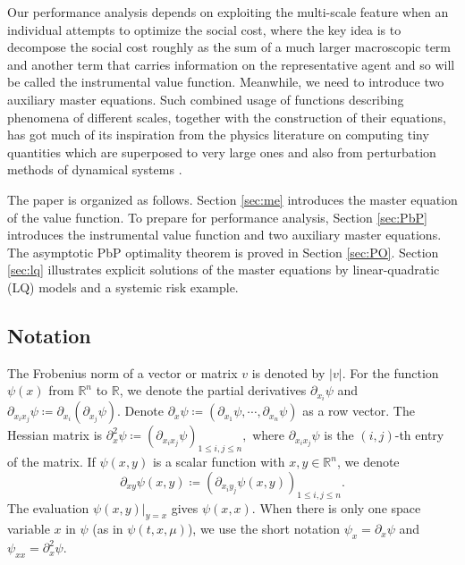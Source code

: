 \documentclass{amsart}
\theoremstyle{definition}
\theoremstyle{remark}
\numberwithin{equation}{section}
\begin{document}
Our performance analysis depends on exploiting the multi-scale feature when an individual attempts to optimize the social cost, where the key idea is to decompose the social cost roughly  as the sum of a much larger macroscopic term and another term  that carries information on the representative agent and so will be called the instrumental value function. Meanwhile,  we need to introduce two auxiliary master equations. Such combined usage of functions describing phenomena of different scales, together with the construction of their equations,  has got much of its inspiration from the physics literature on computing tiny quantities which are superposed to very large ones \cite[p. 199-209]{ABS75} \cite[p. 195-198]{D92}
and also from perturbation methods of dynamical systems \cite[ch. 3]{H13}.





The paper is organized as follows.
Section \ref{sec:me} introduces the master equation of the value function. To prepare for performance analysis,  Section \ref{sec:PbP} introduces the instrumental value function and two auxiliary master equations.
The asymptotic PbP optimality theorem is proved in Section \ref{sec:PO}. Section \ref{sec:lq} illustrates explicit solutions of the master equations by linear-quadratic (LQ) models and a systemic risk example.



\subsection{Notation}
\label{sec:sub:no}


The Frobenius norm of a vector or matrix $v$ is denoted by $|v| $. For the function
$\psi(x)$ from $\mathbb{R}^n$ to $\mathbb{R}$, we denote the partial derivatives
 $\partial_{x_i} \psi$ and
$\partial_{x_ix_j} \psi\coloneqq \partial_{x_i} (\partial_{x_j} \psi )$. Denote $\partial_x \psi\coloneqq (\partial_{x_1} \psi , \cdots, \partial_{x_n}\psi)$ as a row vector. The Hessian matrix is
$
\partial_x^2 \psi \coloneqq  (\partial_{x_i x_j}\psi)_{1\le i,j\le n},
$
where $\partial_{x_i x_j}\psi$ is the $(i,j)$-th entry of the matrix.
If $\psi(x,y)$ is a scalar  function with $x, y\in \mathbb{R}^n$, we denote $$
\partial_{xy}\psi(x,y) \coloneqq   (\partial_{x_i y_j}\psi(x,y) )_{1\le i,j\le n}.
$$
The evaluation $\psi(x,y)|_{y=x}$ gives $\psi(x,x)$. When there is only one space variable $x$ in $\psi$ (as in $\psi(t, x, \mu)$), we use the short notation $\psi_x = \partial_x\psi $ and $\psi_{xx}=\partial_x^2 \psi$.
\end{document}
